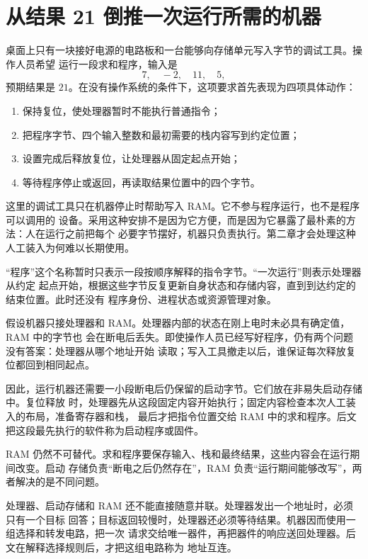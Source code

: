 \section{从结果 21 倒推一次运行所需的机器}

桌面上只有一块接好电源的电路板和一台能够向存储单元写入字节的调试工具。操作人员希望
运行一段求和程序，输入是
\[
7,\quad -2,\quad 11,\quad 5,
\]
预期结果是 \(21\)。在没有操作系统的条件下，这项要求首先表现为四项具体动作：

\begin{enumerate}
\item 保持复位，使处理器暂时不能执行普通指令；
\item 把程序字节、四个输入整数和最初需要的栈内容写到约定位置；
\item 设置完成后释放复位，让处理器从固定起点开始；
\item 等待程序停止或返回，再读取结果位置中的四个字节。
\end{enumerate}

这里的调试工具只在机器停止时帮助写入 RAM。它不参与程序运行，也不是程序可以调用的
设备。采用这种安排不是因为它方便，而是因为它暴露了最朴素的方法：人在运行之前把每个
必要字节摆好，机器只负责执行。第二章才会处理这种人工装入为何难以长期使用。

“程序”这个名称暂时只表示一段按顺序解释的指令字节。“一次运行”则表示处理器从约定
起点开始，根据这些字节反复更新自身状态和存储内容，直到到达约定的结束位置。此时还没有
程序身份、进程状态或资源管理对象。


假设机器只接处理器和 RAM。处理器内部的状态在刚上电时未必具有确定值，RAM 中的字节也
会在断电后丢失。即使操作人员已经写好程序，仍有两个问题没有答案：处理器从哪个地址开始
读取；写入工具撤走以后，谁保证每次释放复位都回到相同起点。

因此，运行机器还需要一小段断电后仍保留的启动字节。它们放在非易失启动存储中。复位释放
时，处理器先从这段固定内容开始执行；固定内容检查本次人工装入的布局，准备寄存器和栈，
最后才把指令位置交给 RAM 中的求和程序。后文把这段最先执行的软件称为启动程序或固件。

RAM 仍然不可替代。求和程序要保存输入、栈和最终结果，这些内容会在运行期间改变。启动
存储负责“断电之后仍然存在”，RAM 负责“运行期间能够改写”，两者解决的是不同问题。


处理器、启动存储和 RAM 还不能直接随意并联。处理器发出一个地址时，必须只有一个目标
回答；目标返回较慢时，处理器还必须等待结果。机器因而使用一组选择和转发电路，把一次
请求交给唯一器件，再把器件的响应送回处理器。后文在解释选择规则后，才把这组电路称为
地址互连。

